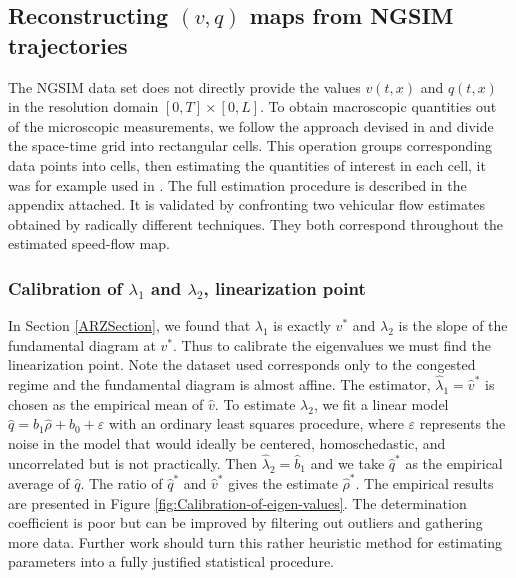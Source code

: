 \documentclass[a4paper, 10pt, conference]{ieeeconf}      %
\begin{document}
\subsection{Reconstructing $(v,q)$ maps from NGSIM trajectories}

The NGSIM data set does not directly provide the values $v(t,x)$ and $q(t,x)$ in the resolution domain $\left[0,T\right]\times\left[0,L\right]$. To obtain macroscopic quantities out of the microscopic measurements, we follow the approach devised in \cite{edie1963discussion} and divide the space-time grid into rectangular cells. This operation groups corresponding data points into cells, then estimating the quantities of interest in each cell, it was for example used in \cite{Piccoli201532}. The full estimation procedure is described in the appendix attached. It is validated by confronting two vehicular flow estimates obtained by radically different techniques. They both correspond throughout the estimated speed-flow map.\\

\subsubsection{Calibration of $\lambda_{1}$ and $\lambda_{2}$, linearization point}
In Section \ref{ARZSection}, we found that $\lambda_{1}$ is exactly $v^*$ and $\lambda_{2}$ is the slope of the fundamental diagram at $v^*$. Thus to calibrate the eigenvalues we must find the linearization point. Note the dataset used corresponds only to the congested regime and the fundamental diagram is almost affine. The estimator, $\widehat{\lambda}_1=\widehat{v}^*$ is chosen as the empirical mean of $\widehat{v}$. To estimate $\lambda_{2}$, we fit a linear model $\widehat{q}=b_{1}\widehat{\rho}+b_{0}+\varepsilon$ with an ordinary least squares procedure, where $\varepsilon$
represents the noise in the model that would ideally be centered,
homoschedastic, and uncorrelated but is not practically. Then $\widehat{\lambda}_{2}=\widehat{b}_{1}$ and we take $\widehat{q}^*$ as the empirical average of $\widehat{q}$. The ratio of $\widehat{q}^*$ and $\widehat{v}^*$ gives the estimate $\widehat{\rho}^*$.
The empirical results are presented in Figure \ref{fig:Calibration-of-eigen-values}. The determination coefficient is poor but can be improved by filtering out outliers and gathering more data. Further work should turn this rather heuristic method for estimating parameters into a fully justified statistical procedure.
\end{document}
